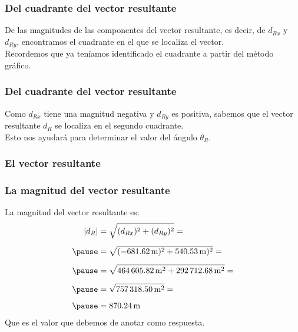 \documentclass[12pt]{beamer}
\begin{document}
\begin{frame}
\frametitle{Del cuadrante del vector resultante}
De las magnitudes de las componentes del vector resultante, es decir, de $d_{Rx}$ y $d_{Ry}$, encontramos el cuadrante en el que se localiza el vector.
\\
\bigskip
\pause
Recordemos que ya teníamos identificado el cuadrante a partir del método gráfico.
\end{frame}
\begin{frame}
\frametitle{Del cuadrante del vector resultante}
Como $d_{Rx}$ tiene una magnitud negativa y $d_{Ry}$ es positiva, \pause sabemos que el vector resultante $d_{R}$ se localiza en el segundo cuadrante.
\\
\bigskip
\pause
Esto nos ayudará para determinar el valor del ángulo $\theta_{R}$.
\end{frame}
\begin{frame}
\frametitle{El vector resultante}
\begin{figure}
    \centering
\end{figure}
\end{frame}
\begin{frame}
\frametitle{La magnitud del vector resultante}
La magnitud del vector resultante es:
\pause
\begin{eqnarray*}
\begin{aligned}
\abs{d_{R}} &= \sqrt{(d_{Rx})^{2} + (d_{Ry})^{2}} = \\[0.5em] \pause
&= \sqrt{ (- \SI{681.62}{\meter})^{2} + \SI{540.53}{\meter})^{2}} = \\[0.5em] \pause
&= \sqrt{ \SI{464605.82}{\square\meter} + \SI{292712.68}{\square\meter} } = \\[0.5em] \pause
&= \sqrt{\SI{757318.50}{\square\meter}} = \\[0.5em] \pause
&= \SI{870.24}{\meter}
\end{aligned}
\end{eqnarray*}
\pause
Que es el valor que debemos de anotar como respuesta.
\end{frame}
\end{document}
